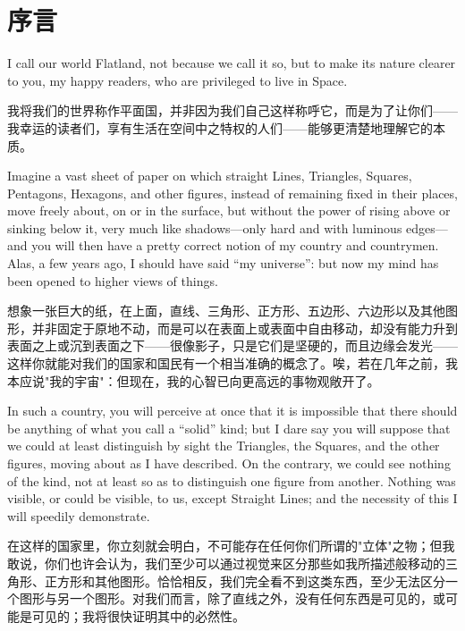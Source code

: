 \documentclass[12pt,UTF8]{ctexbook}
\begin{document}
\chapter*{序言}

I call our world Flatland, not because we call it so, but to make its nature clearer to you, my happy readers, who are privileged to live in Space.

我将我们的世界称作平面国，并非因为我们自己这样称呼它，而是为了让你们——我幸运的读者们，享有生活在空间中之特权的人们——能够更清楚地理解它的本质。

Imagine a vast sheet of paper on which straight Lines, Triangles, Squares, Pentagons, Hexagons, and other figures, instead of remaining fixed in their places, move freely about, on or in the surface, but without the power of rising above or sinking below it, very much like shadows---only hard and with luminous edges---and you will then have a pretty correct notion of my country and countrymen. Alas, a few years ago, I should have said ``my universe'': but now my mind has been opened to higher views of things.

想象一张巨大的纸，在上面，直线、三角形、正方形、五边形、六边形以及其他图形，并非固定于原地不动，而是可以在表面上或表面中自由移动，却没有能力升到表面之上或沉到表面之下——很像影子，只是它们是坚硬的，而且边缘会发光——这样你就能对我们的国家和国民有一个相当准确的概念了。唉，若在几年之前，我本应说"我的宇宙"：但现在，我的心智已向更高远的事物观敞开了。

In such a country, you will perceive at once that it is impossible that there should be anything of what you call a ``solid'' kind; but I dare say you will suppose that we could at least distinguish by sight the Triangles, the Squares, and the other figures, moving about as I have described. On the contrary, we could see nothing of the kind, not at least so as to distinguish one figure from another. Nothing was visible, or could be visible, to us, except Straight Lines; and the necessity of this I will speedily demonstrate.

在这样的国家里，你立刻就会明白，不可能存在任何你们所谓的"立体"之物；但我敢说，你们也许会认为，我们至少可以通过视觉来区分那些如我所描述般移动的三角形、正方形和其他图形。恰恰相反，我们完全看不到这类东西，至少无法区分一个图形与另一个图形。对我们而言，除了直线之外，没有任何东西是可见的，或可能是可见的；我将很快证明其中的必然性。
\end{document}
